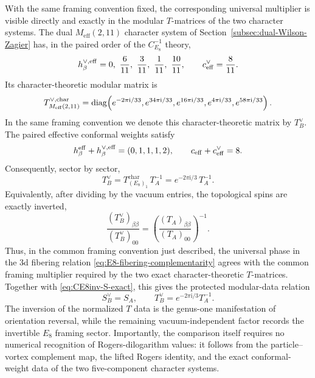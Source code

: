 \documentclass[11pt,a4paper]{article}
\numberwithin{equation}{section}
\begin{document}
With the same framing convention fixed, the corresponding universal multiplier is visible directly and exactly in the modular $T$-matrices of the two character systems.  The dual $M_{\mathrm{eff}}(2,11)$ character system of Section~\ref{subsec:dual-Wilson-Zagier} has, in the paired order of the $C_{E_8}^{-1}$ theory,
\begin{equation}
  h_\beta^{\vee,\rm eff}
  =0,\ \frac6{11},\ \frac3{11},\ \frac1{11},\ \frac{10}{11},
  \qquad
  c_{\rm eff}^\vee=\frac8{11}.
\end{equation}
Its character-theoretic modular matrix is
\begin{equation}
  T_{M_{\rm eff}(2,11)}^{\vee,\mathrm{char}}
  =\operatorname{diag}\!\left(
  e^{-2\pi \mathrm{i}/33},
  e^{34\pi \mathrm{i}/33},
  e^{16\pi \mathrm{i}/33},
  e^{4\pi \mathrm{i}/33},
  e^{58\pi \mathrm{i}/33}
  \right).
  \label{eq:CE8inv-T-matrix}
\end{equation}
In the same framing convention we denote this character-theoretic matrix by $T_B^\vee$.  The paired effective conformal weights satisfy
\begin{equation}
  h_\beta^{\rm eff}+h_\beta^{\vee,\rm eff}
  =(0,1,1,1,2),
  \qquad
  c_{\rm eff}+c_{\rm eff}^\vee=8.
  \label{eq:paired-weights-central-charge}
\end{equation}
Consequently, sector by sector,
\begin{equation}
  T_B^\vee
  =T_{(E_8)_1}^{\mathrm{char}}\,T_A^{-1}
  =e^{-2\pi \mathrm{i}/3}\,T_A^{-1}.
  \label{eq:T-matrix-complementarity}
\end{equation}
Equivalently, after dividing by the vacuum entries, the topological spins are exactly inverted,
\begin{equation}
  \frac{(T_B^\vee)_{\beta\beta}}{(T_B^\vee)_{00}}
  =
  \left(
  \frac{(T_A)_{\beta\beta}}{(T_A)_{00}}
  \right)^{-1}.
  \label{eq:normalized-T-inversion}
\end{equation}
Thus, in the common framing convention just described, the universal phase in the 3d fibering relation \eqref{eq:E8-fibering-complementarity} agrees with the common framing multiplier required by the two exact character-theoretic $T$-matrices.  Together with \eqref{eq:CE8inv-S-exact}, this gives the protected modular-data relation
\begin{equation}
  S_B^\vee=S_A,
  \qquad
  T_B^\vee=e^{-2\pi \mathrm{i}/3}T_A^{-1}.
  \label{eq:AB-protected-modular-relation}
\end{equation}
The inversion of the normalized $T$ data is the genus-one manifestation of orientation reversal, while the remaining vacuum-independent factor records the invertible $E_8$ framing sector.  Importantly, the comparison itself requires no numerical recognition of Rogers-dilogarithm values: it follows from the particle--vortex complement map, the lifted Rogers identity, and the exact conformal-weight data of the two five-component character systems.
\end{document}
